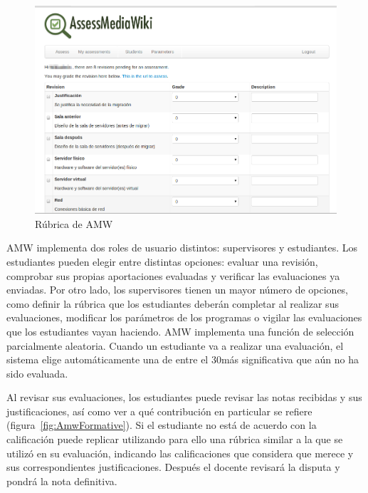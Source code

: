 \begin{figure}
  \begin{center}
    \includegraphics[scale=0.3]{AmwRubrica.png}
  \end{center}
  \caption{Rúbrica de AMW}
  \label{fig:AmwRubrica}
\end{figure}

		AMW implementa dos roles de usuario distintos: supervisores y estudiantes. Los estudiantes pueden elegir entre distintas opciones: evaluar una revisión, comprobar sus propias aportaciones evaluadas y verificar las evaluaciones ya enviadas. Por otro lado, los supervisores tienen un mayor número de opciones, como definir la rúbrica que los estudiantes deberán completar al realizar sus evaluaciones, modificar los parámetros de los programas o vigilar las evaluaciones que los estudiantes vayan haciendo. AMW implementa una función de selección parcialmente aleatoria. Cuando un estudiante va a realizar una evaluación, el sistema elige automáticamente una de entre el 30\percentage más significativa que aún no ha sido evaluada.

		Al revisar sus evaluaciones, los estudiantes puede revisar las notas recibidas y sus justificaciones, así como ver a qué contribución en particular se refiere (figura~\ref{fig:AmwFormative}). Si el estudiante no está de acuerdo con la calificación puede replicar utilizando para ello una rúbrica similar a la que se utilizó en su evaluación, indicando las calificaciones que considera que merece y sus correspondientes justificaciones. Después el docente revisará la disputa y pondrá la nota definitiva.

